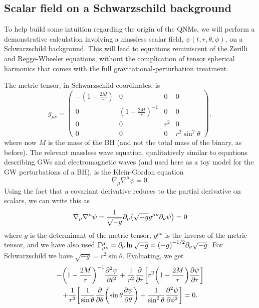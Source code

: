\subsection{Scalar field on a Schwarzschild background}
\label{ch1:sec:scalar}

To help build some intuition regarding the origin of the QNMs, we will perform a demonstrative calculation involving a massless scalar field, $\psi(t,r,\theta,\phi)$, on a Schwarzschild background.
This will lead to equations reminiscent of the Zerilli and Regge-Wheeler equations, without the complication of tensor spherical harmonics that comes with the full gravitational-perturbation treatment.

The metric tensor, in Schwarzschild coordinates, is
\begin{equation}\label{ch1:eq:schwarzschild}
g_{\mu\nu} = \begin{pmatrix}
- \left(1 - \frac{2M}{r}\right) & 0 & 0 & 0 \\
0 & \left(1 - \frac{2M}{r}\right)^{-1} & 0 & 0 \\
0 & 0 & r^2 & 0 \\
0 & 0 & 0 & r^2 \sin^2\theta
\end{pmatrix},
\end{equation}
where now $M$ is the mass of the BH (and not the total mass of the binary, as before). 
The relevant massless wave equation, qualitatively similar to equations describing GWs and electromagnetic waves (and used here as a toy model for the GW perturbations of a BH), is the Klein-Gordon equation 
\begin{equation}
    \nabla_\mu \nabla^\mu \psi = 0.
\end{equation}
Using the fact that a covariant derivative reduces to the partial derivative on scalars, we can write this as
\begin{equation}
    \nabla_\mu \nabla^\mu \psi = \frac{1}{\sqrt{-g}} \partial_\mu \qty(\sqrt{-g} g^{\mu\nu} \partial_\nu \psi) = 0
\end{equation}
where $g$ is the determinant of the metric tensor, $g^{\mu\nu}$ is the inverse of the metric tensor, and we have also used $\Gamma^\mu_{\mu\nu} = \partial_\nu \ln{\sqrt{-g}} = \qty(-g)^{-1/2} \partial_\nu \sqrt{-g}$.
For Schwarzschild we have $\sqrt{-g} = r^2 \sin{\theta}$.
Evaluating, we get
\begin{multline}
    - \qty(1 - \frac{2M}{r})^{-1} \pdv[2]{\psi}{t} + \frac{1}{r^2} \pdv{r} \qty[r^2 \qty(1 - \frac{2M}{r}) \pdv{\psi}{r} ]\\
    + \frac{1}{r^2} \qty[ \frac{1}{\sin{\theta}} \pdv{\theta} \qty(\sin{\theta} \pdv{\psi}{\theta} ) + \frac{1}{\sin^2{\theta}} \pdv[2]{\psi}{\phi} ] = 0.
\end{multline}
